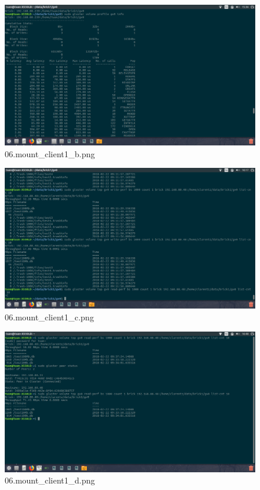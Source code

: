 \documentclass{article}
\begin{document}
\begin{figure}[h!]
\centering
\includegraphics[scale=0.5]{06.mount_client1_b.png}
\caption{06.mount_client1_b.png}
\label{fig:glusterfsfigure}
\end{figure}

\begin{figure}[h!]
\centering
\includegraphics[scale=0.5]{06.mount_client1_c.png}
\caption{06.mount_client1_c.png}
\label{fig:glusterfsfigure}
\end{figure}

\begin{figure}[h!]
\centering
\includegraphics[scale=0.5]{06.mount_client1_d.png}
\caption{06.mount_client1_d.png}
\label{fig:glusterfsfigure}
\end{figure}
\end{document}
